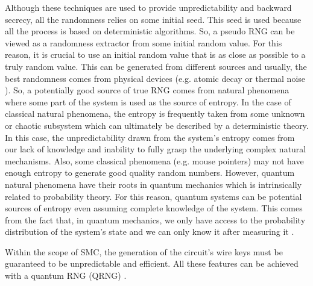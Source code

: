 Although these techniques are used to provide unpredictability and backward secrecy, all the randomness relies on some initial seed. This seed is used because all the process is based on deterministic algorithms. So, a pseudo RNG can be viewed as a randomness extractor from some initial random value. For this reason, it is crucial to use an initial random value that is as close as possible to a truly random value. This can be generated from different sources and usually, the best randomness comes from physical devices (e.g. atomic decay \cite{Alkassar2005} or thermal noise \cite{GaviriaRojas2017}). So, a potentially good source of true RNG comes from natural phenomena where some part of the system is used as the source of entropy. In the case of classical natural phenomena, the entropy is frequently taken from some unknown or chaotic subsystem which can ultimately be described by a deterministic theory. In this case, the unpredictability drawn from the system’s entropy comes from our lack of knowledge and inability to fully grasp the underlying complex natural mechanisms. Also, some classical phenomena (e.g. mouse pointers) may not have enough entropy to generate good quality random numbers. However, quantum natural phenomena have their roots in quantum mechanics which is intrinsically related to probability theory. For this reason, quantum systems can be potential sources of entropy even assuming complete knowledge of the system. This comes from the fact that, in quantum mechanics, we only have access to the probability distribution of the system's state and we can only know it after measuring it \cite{HerreroCollantes2017}.



Within the scope of SMC, the generation of the circuit's wire keys must be guaranteed to be unpredictable and efficient. All these features can be achieved with a quantum RNG (QRNG) \cite{Ferreira2021}.


